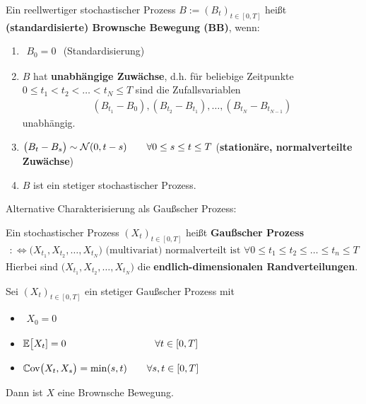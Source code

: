 \begin{defi}
	Ein reellwertiger stochastischer Prozess $B:=(B_t)_{t\in[0,T]}$ heißt\\ \textbf{(standardisierte) Brownsche Bewegung (BB)}, wenn:
	\begin{enumerate}[label=\alph*)]
		\item $\begin{aligned}
			B_0=0
		\end{aligned}$ (Standardisierung)
		\item $B$ hat \textbf{unabhängige Zuwächse}, d.h. für beliebige Zeitpunkte\\ $0\leq t_1<t_2<\ldots<t_N\leq T$ sind die Zufallsvariablen
		\begin{align*}
			\left(B_{t_1}-B_0\right),\left(B_{t_2}-B_{t_1}\right),\ldots,\left(B_{t_N}-B_{t_{N-1}}\right)
		\end{align*}
		unabhängig.
		\item $\begin{aligned}
			\big(B_t-B_s\big)\sim\mathcal{N}(0,t-s)\qquad\forall 0\leq s\leq t\leq T
		\end{aligned}$  (\textbf{stationäre, normalverteilte Zuwächse})
		\item $B$ ist ein stetiger stochastischer Prozess.
	\end{enumerate}
\end{defi}

Alternative Charakterisierung als Gaußscher Prozess:

\begin{defi}
	Ein stochastischer Prozess $(X_t)_{t\in[0,T]}$ heißt \textbf{Gaußscher Prozess}
	\begin{align*}
		:\Longleftrightarrow \Big(X_{t_1},X_{t_2},\ldots,X_{t_N}\Big)\text{ (multivariat) normalverteilt ist }\forall0\leq t_1\leq t_2\leq\ldots\leq t_n\leq T  
	\end{align*}
	Hierbei sind $\big(X_{t_1},X_{t_2},\ldots,X_{t_N}\big)$ die \textbf{endlich-dimensionalen Randverteilungen}.
\end{defi}

\begin{lemma}\label{10.1}
	Sei $(X_t)_{t\in [0,T]}$ ein stetiger Gaußscher Prozess mit 
	\begin{itemize}
		\item $\begin{aligned}
			X_0=0
		\end{aligned}$
		\item $\begin{aligned}
			\mathbb{E}\big[X_t]=0 \hspace{90pt}\forall t\in[0,T]
		\end{aligned}$
		\item $\begin{aligned}
			\mathbb{C}\text{ov}\big(X_t,X_s\big)=\min(s,t) \qquad\forall s,t\in[0,T]
		\end{aligned}$
	\end{itemize}
	Dann ist $X$ eine Brownsche Bewegung.
\end{lemma}

